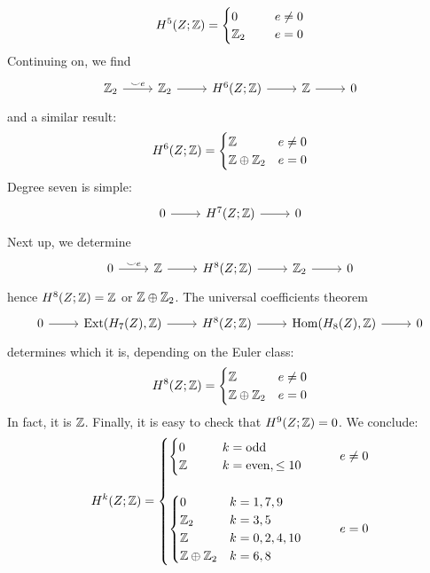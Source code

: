 \documentclass{scrartcl}
\begin{document}
\begin{equation*}
	H^5(Z;\mathbb{Z})=
	\begin{cases}
		0 \qquad & e\neq 0\\
		\mathbb{Z}_2 & e=0
	\end{cases}
\end{equation*}
Continuing on, we find
\begin{equation*}
	\begin{tikzcd}
		\Z_2 \ar[r,"\smile e"] & \Z_2 \ar[r] & H^6(Z;\Z) \ar[r] & \Z \ar[r] & 0
	\end{tikzcd}
\end{equation*}
and a similar result:
\begin{equation*}
	H^6(Z;\mathbb{Z})=
	\begin{cases}
		\mathbb{Z} \qquad & e\neq 0\\
		\mathbb{Z}\oplus\mathbb{Z}_2 & e=0
	\end{cases}
\end{equation*}
Degree seven is simple:
\begin{equation*}
	\begin{tikzcd}
		0\ar[r] & H^7(Z;\Z) \ar[r] & 0 
	\end{tikzcd}
\end{equation*}
Next up, we determine
\begin{equation*}
	\begin{tikzcd}
		0 \ar[r,"\smile e"] & \Z\ar[r] & H^8(Z;\Z) \ar[r] & \Z_2 \ar[r] & 0
	\end{tikzcd}
\end{equation*}
hence $H^8(Z;\mathbb{Z})=\mathbb{Z}$ or $\mathbb{Z}\oplus \mathbb{Z}_2$. The universal coefficients theorem
\begin{equation*}
	\begin{tikzcd}
		0 \ar[r] & \Ext(H_7(Z),\Z) \ar[r] & H^8(Z;\Z) \ar[r] & \Hom(H_8(Z),\Z) \ar[r] & 0
	\end{tikzcd}
\end{equation*}
determines which it is, depending on the Euler class:
\begin{equation*}
	H^8(Z;\mathbb{Z})=
	\begin{cases}
		\mathbb{Z} \qquad &e\neq 0\\
		\mathbb{Z}\oplus\mathbb{Z}_2 &e=0
	\end{cases}
\end{equation*}
In fact, it is $\mathbb{Z}$. Finally, it is easy to check that $H^9(Z;\mathbb{Z})=0$. We conclude:
\begin{equation*}
	H^k(Z;\mathbb{Z})=
	\begin{cases}
		\begin{cases}
			0 \qquad &k=\text{odd}\\
			\mathbb{Z} &k=\text{even},\leq 10
		\end{cases}\qquad &e\neq 0\\
		\\
		\begin{cases}
			0\qquad & k=1,7,9\\
			\mathbb{Z}_2 &k=3,5\\
			\mathbb{Z} &k=0,2,4,10\\
			\mathbb{Z}\oplus\mathbb{Z}_2 &k=6,8
		\end{cases} &e=0
	\end{cases}
\end{equation*}
\end{document}
